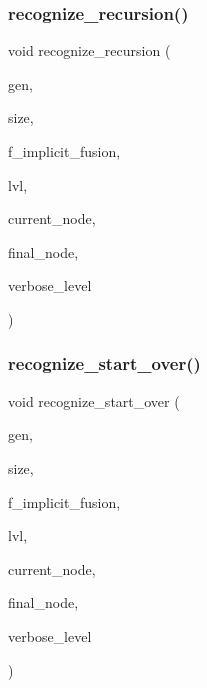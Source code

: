 \subsubsection{\texorpdfstring{recognize\+\_\+recursion()}{recognize\_recursion()}}
{\footnotesize\ttfamily void recognize\+\_\+recursion (\begin{DoxyParamCaption}\item[{\mbox{\hyperlink{classgenerator}{generator}} $\ast$}]{gen,  }\item[{\mbox{\hyperlink{galois_8h_a09fddde158a3a20bd2dcadb609de11dc}{I\+NT}}}]{size,  }\item[{\mbox{\hyperlink{galois_8h_a09fddde158a3a20bd2dcadb609de11dc}{I\+NT}}}]{f\+\_\+implicit\+\_\+fusion,  }\item[{\mbox{\hyperlink{galois_8h_a09fddde158a3a20bd2dcadb609de11dc}{I\+NT}}}]{lvl,  }\item[{\mbox{\hyperlink{galois_8h_a09fddde158a3a20bd2dcadb609de11dc}{I\+NT}}}]{current\+\_\+node,  }\item[{\mbox{\hyperlink{galois_8h_a09fddde158a3a20bd2dcadb609de11dc}{I\+NT}} \&}]{final\+\_\+node,  }\item[{\mbox{\hyperlink{galois_8h_a09fddde158a3a20bd2dcadb609de11dc}{I\+NT}}}]{verbose\+\_\+level }\end{DoxyParamCaption})}

\mbox{\label{recognize_8_c_a0b485aaa256987a8c2ebb559618e891f}} 
\subsubsection{\texorpdfstring{recognize\+\_\+start\+\_\+over()}{recognize\_start\_over()}}
{\footnotesize\ttfamily void recognize\+\_\+start\+\_\+over (\begin{DoxyParamCaption}\item[{\mbox{\hyperlink{classgenerator}{generator}} $\ast$}]{gen,  }\item[{\mbox{\hyperlink{galois_8h_a09fddde158a3a20bd2dcadb609de11dc}{I\+NT}}}]{size,  }\item[{\mbox{\hyperlink{galois_8h_a09fddde158a3a20bd2dcadb609de11dc}{I\+NT}}}]{f\+\_\+implicit\+\_\+fusion,  }\item[{\mbox{\hyperlink{galois_8h_a09fddde158a3a20bd2dcadb609de11dc}{I\+NT}}}]{lvl,  }\item[{\mbox{\hyperlink{galois_8h_a09fddde158a3a20bd2dcadb609de11dc}{I\+NT}}}]{current\+\_\+node,  }\item[{\mbox{\hyperlink{galois_8h_a09fddde158a3a20bd2dcadb609de11dc}{I\+NT}} \&}]{final\+\_\+node,  }\item[{\mbox{\hyperlink{galois_8h_a09fddde158a3a20bd2dcadb609de11dc}{I\+NT}}}]{verbose\+\_\+level }\end{DoxyParamCaption})}

